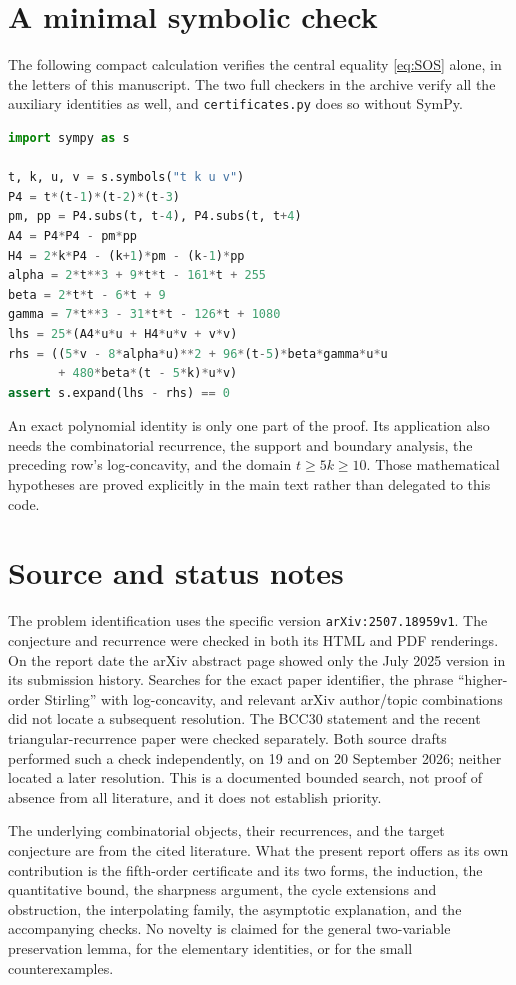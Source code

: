 \documentclass[11pt,a4paper]{article}
\numberwithin{equation}{section}
\theoremstyle{definition}
\theoremstyle{remark}
\begin{document}
\section{A minimal symbolic check}\label{sec:minimal-check}

The following compact calculation verifies the central equality
\eqref{eq:SOS} alone, in the letters of this manuscript. The two full
checkers in the archive verify all the auxiliary identities as well, and
\texttt{certificates.py} does so without SymPy.
\begin{lstlisting}[language=Python]
import sympy as s

t, k, u, v = s.symbols("t k u v")
P4 = t*(t-1)*(t-2)*(t-3)
pm, pp = P4.subs(t, t-4), P4.subs(t, t+4)
A4 = P4*P4 - pm*pp
H4 = 2*k*P4 - (k+1)*pm - (k-1)*pp
alpha = 2*t**3 + 9*t*t - 161*t + 255
beta = 2*t*t - 6*t + 9
gamma = 7*t**3 - 31*t*t - 126*t + 1080
lhs = 25*(A4*u*u + H4*u*v + v*v)
rhs = ((5*v - 8*alpha*u)**2 + 96*(t-5)*beta*gamma*u*u
       + 480*beta*(t - 5*k)*u*v)
assert s.expand(lhs - rhs) == 0
\end{lstlisting}
An exact polynomial identity is only one part of the proof. Its
application also needs the combinatorial recurrence, the support and
boundary analysis, the preceding row's log-concavity, and the domain
$t\ge5k\ge10$. Those mathematical hypotheses are proved explicitly in
the main text rather than delegated to this code.

\section{Source and status notes}\label{sec:status}

The problem identification uses the specific version
\texttt{arXiv:2507.18959v1}. The conjecture and recurrence were checked in
both its HTML and PDF renderings. On the report date the arXiv abstract
page showed only the July 2025 version in its submission history.
Searches for the exact paper identifier, the phrase ``higher-order Stirling''
with log-concavity, and relevant arXiv author/topic combinations did not
locate a subsequent resolution. The BCC30 statement and the recent
triangular-recurrence paper \cite{Shankar} were checked separately.
Both source drafts performed such a check independently, on 19 and on
20 September 2026; neither located a later resolution. This is a documented
bounded search, not proof of absence from all literature, and it does not
establish priority.

The underlying combinatorial objects, their recurrences, and the target
conjecture are from the cited literature. What the present report offers as
its own contribution is the fifth-order certificate and its two forms, the
induction, the quantitative bound, the sharpness argument, the cycle
extensions and obstruction, the interpolating family, the asymptotic
explanation, and the accompanying checks. No novelty is claimed for the
general two-variable preservation lemma, for the elementary identities, or
for the small counterexamples.
\end{document}
